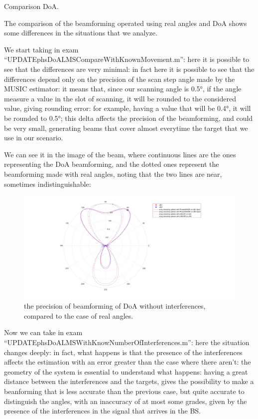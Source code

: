 \documentclass[a4paper,10pt]{article}
\title{}
\author{}
\begin{document}
\maketitle
Comparison DoA.
\begin{abstract}
	
\end{abstract}
The comparison of the beamforming operated using real angles and DoA shows some differences in the situations that we analyze.

We start taking in exam “UPDATEphsDoALMSCompareWithKnownMovement.m”: here it is possible to see that the differences are very minimal: in fact here it is possible to see that the differences depend only on the precision of the scan step angle made by the MUSIC estimator: it means that, since our scanning angle is 0.5°, if the angle measure a value in the slot of scanning, it will be rounded to the considered value, giving rounding error: for example, having a value that will be 0.4°, it will be rounded to 0.5°; this delta affects the precision of the beamforming, and could be very small, generating beams that cover almost everytime the target that we use in our scenario.
 
 We can see it in the image of the beam, where continuous lines are the ones representing the DoA beamforming, and the dotted ones represent the beamforming made with real angles, noting that the two lines are near, sometimes indistinguishable:
\begin{figure}[H]
	\centering
	\includegraphics[width=0.8\linewidth]{polarplot60.png}
	\caption{\label{fig:polarplot60}the precision of beamforming of DoA without interferences, compared to the case of real angles.}
\end{figure}

Now we can take in exam “UPDATEphsDoALMSWithKnowNumberOfInterferences.m”: here the situation changes deeply: in fact, what happens is that the presence of the interferences affects the estimation with an error greater than the case where there aren't: the geometry of the system is essential to understand what happens: having a great distance between the interferences and the targets, gives the possibility to make a beanforming that is less accurate than the previous case, but quite accurate to distinguish the angles, with an inaccuracy of at most some grades, given by the presence of the interferences in the signal that arrives in the BS.
\end{document}
